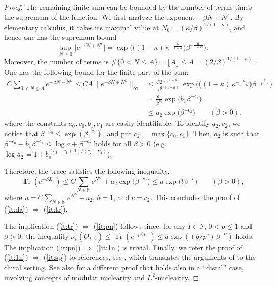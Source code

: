 \documentclass[a4paper,12pt]{article}
\theoremstyle{plain}
\theoremstyle{definition}
\theoremstyle{remark}
\DeclareMathOperator{\Tr}{Tr}
\begin{document}
\begin{proof}
  The remaining finite sum can be bounded by the number of terms times the supremum of the function. We first analyze the exponent $-\beta N + N^\kappa$. By elementary calculus, it takes its maximal value at $N_0 = (\kappa/\beta)^{1/(1-\kappa)}$, and hence one has the supremum bound
  \[ \sup_{N\ge 0}\big|e^{-\beta N + N^\kappa}\big| = \exp\Big(\Big((1-\kappa)\,\kappa^{-\frac{\kappa}{1-\kappa}}\Big) \beta^{-\frac{\kappa}{1-\kappa}} \Big). \]
Moreover, the number of terms is $\#\{0<N\le A\} = \lfloor A \rfloor \le A = (2/\beta)^{1/(1-\kappa)}$. One has the following bound for the finite part of the sum:
  \begin{align*} C\sum_{0<N\le A} e^{-\beta N + N^\kappa} \le CA \|e^{-\beta N + N^\kappa}\|_\infty
    & \le \frac{C2^{1/(1-\kappa)}}{\beta^{1/(1-\kappa)}} \exp\Big(\Big((1-\kappa)\,\kappa^{-\frac{\kappa}{1-\kappa}}\Big) \beta^{-\frac{\kappa}{1-\kappa}} \Big)\\
    & = \frac{a_0}{\beta^{c_0}} \exp\Big(b_1 \beta^{-c_1}\Big) \\
    & \le a_2 \exp\Big(\beta^{-c_2}\Big) \qquad (\beta>0).
  \end{align*}
  where the constants $a_0,c_0,b_1,c_1$ are easily identifiable.
  To identify $a_2,c_2$, we notice that $\beta^{-c_0} \le \exp(\beta^{-c_0})$, and put $c_2 = \max\{c_0,c_1\}$.
  Then, $a_2$ is such that $\beta^{-c_0} + b_1\beta^{-c_1} \le \log a + \beta^{-c_2}$ holds for all $\beta>0$
  (e.g.\! $\log a_2 = 1 + b_1^{(c_2-c_1+1)/(c_2-c_1)}$).

  Therefore, the trace satisfies the following inequality.
  \[ \Tr(e^{-\beta L_0}) \le C\sum_{N\in \mathbb{N}} e^{N^\kappa} + a_2\exp\big(\beta^{-c_2}\big) \le a\exp\big(b\beta^{-c}\big) \qquad (\beta>0), \]
  where $a = C\sum_{N\in \mathbb{N}} e^{N^\kappa} + a_2$, $b=1$, and $c=c_2$. 
  This concludes the proof of (\ref{it:da}) $\Rightarrow$ (\ref{it:tr}).

  
  The implication (\ref{it:tr}) $\Rightarrow$ (\ref{it:pn}) follows since, for any $I\in\mathcal{I}$, $0<p\le 1$ and $\beta >0$, the inequality $\nu_p(\Theta_{I,\beta}) \le \Tr(e^{-p\beta L_0}) \le a\exp\left( (b/p^c)\,\beta^{-c}\right)$ holds. 
  The implication (\ref{it:pn}) $\Rightarrow$ (\ref{it:1n}) is trivial. Finally, we refer the proof of (\ref{it:1n}) $\Rightarrow$ (\ref{it:sp}) to references, see \cite[Lemma 2.12]{gabfro93}, which translates the arguments of \cite[Section 2]{bdf87} to the chiral setting. See also \cite[Corollary 6.4]{bdl07} for a different proof that holds also in a ``distal'' case, involving concepts of modular nuclearity and $L^2$-nuclearity.
\end{proof}
\end{document}
